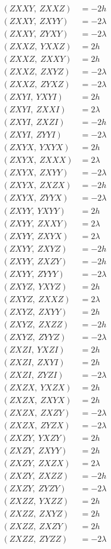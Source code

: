 \documentclass{article}
\begin{document}
\begin{align*}
  (ZXXY,\ ZXXZ) &= - 2 h \\
  (ZXXY,\ ZXYY) &= - 2 \lambda \\
  (ZXXY,\ ZYXY) &= - 2 \lambda \\
  (ZXXZ,\ YXXZ) &= 2 h \\
  (ZXXZ,\ ZXXY) &= 2 h \\
  (ZXXZ,\ ZXYZ) &= - 2 \lambda \\
  (ZXXZ,\ ZYXZ) &= - 2 \lambda \\
  (ZXYI,\ YXYI) &= 2 h \\
  (ZXYI,\ ZXXI) &= 2 \lambda \\
  (ZXYI,\ ZXZI) &= - 2 h \\
  (ZXYI,\ ZYYI) &= - 2 \lambda \\
  (ZXYX,\ YXYX) &= 2 h \\
  (ZXYX,\ ZXXX) &= 2 \lambda \\
  (ZXYX,\ ZXYY) &= - 2 \lambda \\
  (ZXYX,\ ZXZX) &= - 2 h \\
  (ZXYX,\ ZYYX) &= - 2 \lambda \\
  (ZXYY,\ YXYY) &= 2 h \\
  (ZXYY,\ ZXXY) &= 2 \lambda \\
  (ZXYY,\ ZXYX) &= 2 \lambda \\
  (ZXYY,\ ZXYZ) &= - 2 h \\
  (ZXYY,\ ZXZY) &= - 2 h \\
  (ZXYY,\ ZYYY) &= - 2 \lambda \\
  (ZXYZ,\ YXYZ) &= 2 h \\
  (ZXYZ,\ ZXXZ) &= 2 \lambda \\
  (ZXYZ,\ ZXYY) &= 2 h \\
  (ZXYZ,\ ZXZZ) &= - 2 h \\
  (ZXYZ,\ ZYYZ) &= - 2 \lambda \\
  (ZXZI,\ YXZI) &= 2 h \\
  (ZXZI,\ ZXYI) &= 2 h \\
  (ZXZI,\ ZYZI) &= - 2 \lambda \\
  (ZXZX,\ YXZX) &= 2 h \\
  (ZXZX,\ ZXYX) &= 2 h \\
  (ZXZX,\ ZXZY) &= - 2 \lambda \\
  (ZXZX,\ ZYZX) &= - 2 \lambda \\
  (ZXZY,\ YXZY) &= 2 h \\
  (ZXZY,\ ZXYY) &= 2 h \\
  (ZXZY,\ ZXZX) &= 2 \lambda \\
  (ZXZY,\ ZXZZ) &= - 2 h \\
  (ZXZY,\ ZYZY) &= - 2 \lambda \\
  (ZXZZ,\ YXZZ) &= 2 h \\
  (ZXZZ,\ ZXYZ) &= 2 h \\
  (ZXZZ,\ ZXZY) &= 2 h \\
  (ZXZZ,\ ZYZZ) &= - 2 \lambda
\end{align*}
\end{document}
